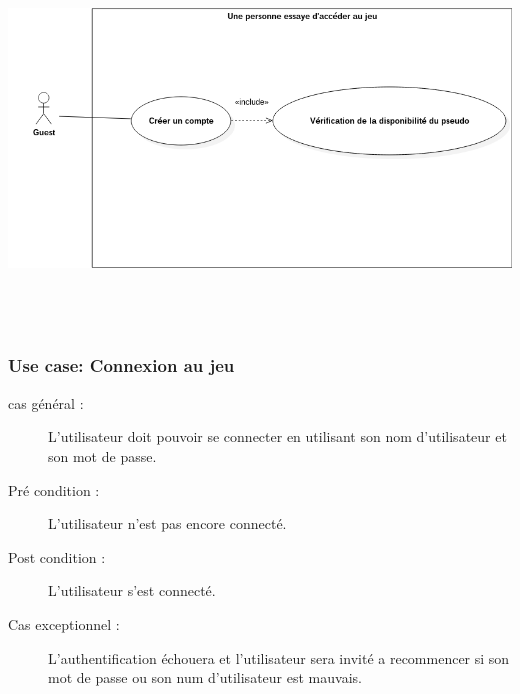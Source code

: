 \documentclass[10pt,a4paper]{article}
\begin{document}
\begin{center}
    \includegraphics[height=10cm,width=15cm]{personne_acces_jeu.png}
\end{center}

\subsubsection{Use case: Connexion au jeu}

\begin{description}
	\item[cas général :] L'\gls{utilisateur} doit pouvoir se connecter en utilisant son nom d'\gls{utilisateur} et son mot de passe.
    \item[Pré condition :] L'\gls{utilisateur} n'est pas encore connecté.
    \item[Post condition :] L'\gls{utilisateur} s'est connecté.
    \item[Cas exceptionnel :] L'authentification échouera et l'\gls{utilisateur} sera invité a recommencer si son mot de passe ou son num d'\gls{utilisateur} est mauvais.
\end{description}
\newpage

	
\end{document}
